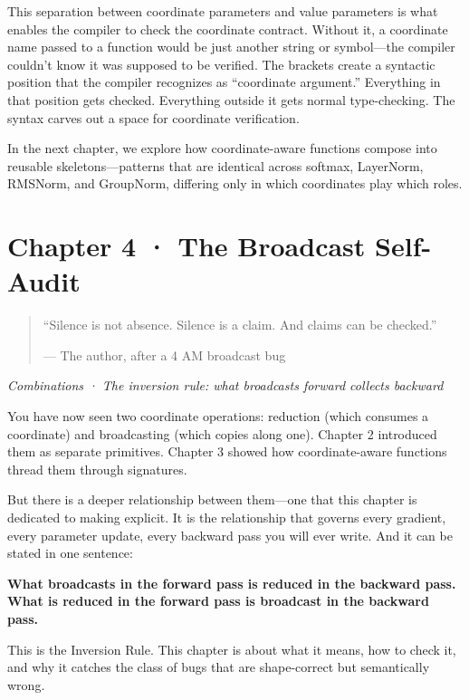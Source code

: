 \documentclass[11pt,titlepage]{article}
\begin{document}
This separation between coordinate parameters and value parameters is
what enables the compiler to check the coordinate contract. Without it,
a coordinate name passed to a function would be just another string or
symbol---the compiler couldn't know it was supposed to be verified. The
brackets create a syntactic position that the compiler recognizes as
``coordinate argument.'' Everything in that position gets checked.
Everything outside it gets normal type-checking. The syntax carves out a
space for coordinate verification.

In the next chapter, we explore how coordinate-aware functions compose
into reusable skeletons---patterns that are identical across softmax,
LayerNorm, RMSNorm, and GroupNorm, differing only in which coordinates
play which roles.

\newpage

\hypertarget{chapter-4-the-broadcast-self-audit}{%
\section{Chapter 4 · The Broadcast
Self-Audit}\label{chapter-4-the-broadcast-self-audit}}

\begin{quote}
``Silence is not absence. Silence is a claim. And claims can be
checked.''

--- The author, after a 4 AM broadcast bug
\end{quote}

\emph{Combinations · The inversion rule: what broadcasts forward
collects backward}

\vspace{2em}

You have now seen two coordinate operations: reduction (which consumes a
coordinate) and broadcasting (which copies along one). Chapter 2
introduced them as separate primitives. Chapter 3 showed how
coordinate-aware functions thread them through signatures.

But there is a deeper relationship between them---one that this chapter
is dedicated to making explicit. It is the relationship that governs
every gradient, every parameter update, every backward pass you will
ever write. And it can be stated in one sentence:

\textbf{What broadcasts in the forward pass is reduced in the backward
pass. What is reduced in the forward pass is broadcast in the backward
pass.}

This is the Inversion Rule. This chapter is about what it means, how to
check it, and why it catches the class of bugs that are shape-correct
but semantically wrong.
\end{document}
